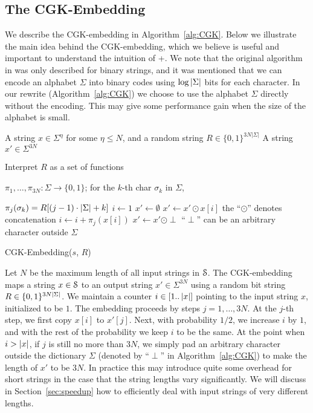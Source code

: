 \subsection{The CGK-Embedding}
\label{sec:CGK}

We describe the CGK-embedding in Algorithm~\ref{alg:CGK}. Below we  illustrate the main idea behind the CGK-embedding, which we believe is useful and important to understand the intuition of \ebdjoin+.  We note that the original algorithm in \cite{CGK16} was only described for binary strings, and it was mentioned that we can encode an alphabet $\Sigma$ into binary codes using $\log\abs{\Sigma}$ bits for each character.  In our rewrite (Algorithm~\ref{alg:CGK}) we choose to use the alphabet $\Sigma$ directly without the encoding.  This may give some performance gain when the size of the alphabet is small. 


\begin{algorithm}[t]
\begin{algorithmic}[1]
\Require A string $x \in \Sigma^\eta$ for some $\eta \le N$, and a random string $R \in \{0,1\}^{ 3 N |\Sigma|}$
\Ensure A string $x' \in \Sigma^{3N}$
\smallskip


\State Interpret $R$ as a set of functions 

$\pi_1,\dots,\pi_{3N}:  \Sigma \rightarrow \{0,1\}$; for the $k$-th char $\sigma_k$ in $\Sigma$, 

$\pi_j(\sigma_k) = R[(j-1) \cdot \abs{\Sigma} + k]$
\State $i \leftarrow 1$
\State $x' \leftarrow \emptyset$ 
		\State $x' \leftarrow x' \odot x[i]$ 
		\Comment the ``$\odot$'' denotes concatenation
		\State $i \leftarrow i+\pi_j(x[i])$
	\Else
		\State $x' \leftarrow x' \odot \perp$
		\Comment ``$\perp$'' can be an arbitrary character outside $\Sigma$
	\EndIf
\EndFor 
\end{algorithmic}
\caption{CGK-Embedding($s$, $R$) \cite{CGK16}}
\label{alg:CGK}
\end{algorithm}


Let $N$ be the maximum length of all input strings in $\S$. The CGK-embedding maps a string $x \in \S$ to an output string $x' \in \Sigma^{3N}$ using a random bit string $R \in \{0,1\}^{3N\abs{\Sigma}}$.  We maintain a counter $i \in [1 .. \abs{x}]$ pointing to the input string $x$, initialized to be $1$.  The embedding proceeds by steps $j = 1, \ldots, 3N$. At the $j$-th step, we first copy $x[i]$ to $x'[j]$. Next, with probability $1/2$, we increase $i$ by $1$, and with the rest of the probability we keep $i$ to be the same.  At the point when $i > \abs{x}$, if $j$ is still no more than $3N$, we simply pad an arbitrary character outside the dictionary $\Sigma$ (denoted by ``$\perp$'' in Algorithm~\ref{alg:CGK}) to make the length of $x'$ to be $3N$.  In practice this may introduce quite some overhead for short strings in the case that the string lengths vary significantly. We will discuss in Section~\ref{sec:speedup} how to efficiently deal with input strings of very different lengths.

